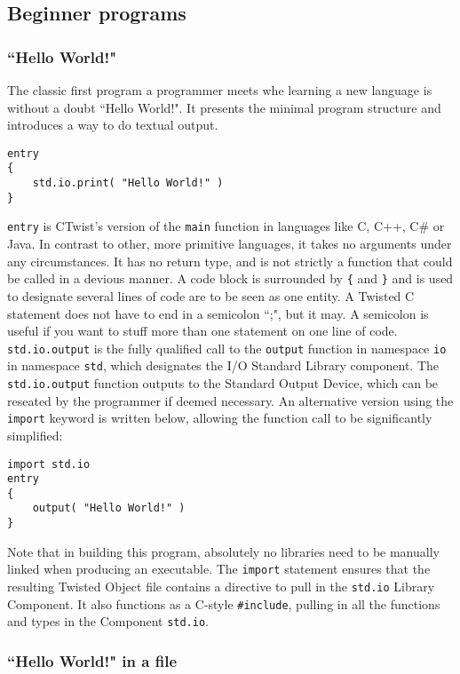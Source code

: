 \documentclass[a4paper,11pt]{article}
\newcommand{\tcode}[1]{\texttt{#1}}
\begin{document}
  \subsection{Beginner programs}

    \subsubsection{``Hello World!"}

The classic first program a programmer meets whe learning a new language is without a doubt ``Hello World!".
It presents the minimal program structure and introduces a way to do textual output.
\begin{lstlisting}
entry
{
    std.io.print( "Hello World!" )
}
\end{lstlisting}
\lstinline|entry| is CTwist's version of the \lstinline|main| function in languages like C, C++, C\# or Java.
In contrast to other, more primitive languages, it takes no arguments under any circumstances.
It has no return type, and is not strictly a function that could be called in a devious manner.
A code block is surrounded by \tcode{\{} and \tcode{\}} and is used to designate several lines of code are to be seen as one entity.
A Twisted C statement does not have to end in a semicolon ``;", but it may.
A semicolon is useful if you want to stuff more than one statement on one line of code.
\tcode{std.io.output} is the fully qualified call to the \tcode{output} function in namespace \tcode{io} in namespace \tcode{std}, which designates the I/O Standard Library component.
The \tcode{std.io.output} function outputs to the Standard Output Device, which can be reseated by the programmer if deemed necessary.
An alternative version using the \tcode{import} keyword is written below, allowing the function call to be significantly simplified:
\begin{lstlisting}
import std.io
entry
{
    output( "Hello World!" )
}
\end{lstlisting}
Note that in building this program, absolutely no libraries need to be manually linked when producing an executable.
The \tcode{import} statement ensures that the resulting Twisted Object file contains a directive to pull in the \tcode{std.io} Library Component.
It also functions as a C-style \tcode{\#include}, pulling in all the functions and types in the Component \tcode{std.io}.

    \subsubsection{``Hello World!" in a file}
\end{document}
